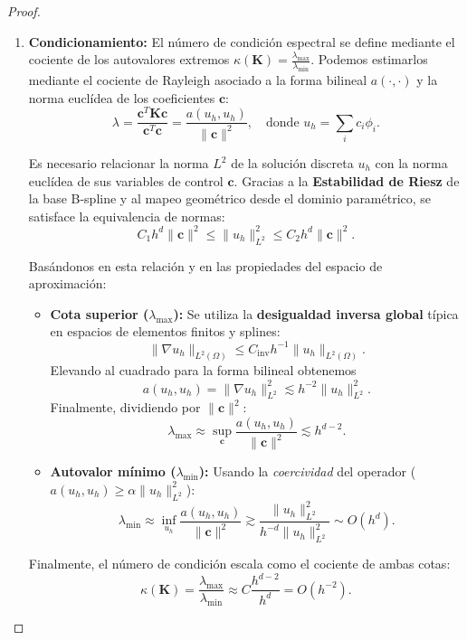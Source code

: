 \documentclass[11pt]{book}
\theoremstyle{plain} %
\theoremstyle{definition} %
\theoremstyle{definition} %
\begin{document}
\begin{proof}
\begin{enumerate}
        \item \textbf{Condicionamiento:} 
        El número de condición espectral se define mediante el cociente de los autovalores extremos $\kappa(\mathbf{K}) = \frac{\lambda_{\max}}{\lambda_{\min}}$. Podemos estimarlos mediante el cociente de Rayleigh asociado a la forma bilineal $a(\cdot, \cdot)$ y la norma euclídea de los coeficientes $\mathbf{c}$:
        $$ \lambda = \frac{\mathbf{c}^T \mathbf{K} \mathbf{c}}{\mathbf{c}^T \mathbf{c}} = \frac{a(u_h, u_h)}{\|\mathbf{c}\|^2}, \quad \text{donde } u_h = \sum_{i} c_i \phi_i. $$
        
        Es necesario relacionar la norma $L^2$ de la solución discreta $u_h$ con la norma euclídea de sus variables de control $\mathbf{c}$. Gracias a la \textbf{Estabilidad de Riesz} de la base B-spline y al mapeo geométrico desde el dominio paramétrico, se satisface la equivalencia de normas:
        $$ C_1 h^d \|\mathbf{c}\|^2 \le \|u_h\|_{L^2}^2 \le C_2 h^d \|\mathbf{c}\|^2. $$

        Basándonos en esta relación y en las propiedades del espacio de aproximación:        
        \begin{itemize}
            \item \textbf{Cota superior ($\lambda_{\max}$):} 
            Se utiliza la \textbf{desigualdad inversa global} típica en espacios de elementos finitos y splines:
            \begin{equation*}
                \|\nabla u_h\|_{L^2(\Omega)} \le C_{\text{inv}} h^{-1} \|u_h\|_{L^2(\Omega)}.
            \end{equation*}
            Elevando al cuadrado para la forma bilineal obtenemos
            $$ a(u_h, u_h) = \|\nabla u_h\|_{L^2}^2 \lesssim h^{-2} \|u_h\|_{L^2}^2. $$
            Finalmente, dividiendo por $\|\mathbf{c}\|^2$:
            $$ \lambda_{\max} \approx \sup_{\mathbf{c}} \frac{a(u_h, u_h)}{\|\mathbf{c}\|^2} \lesssim h^{d-2}. $$

            \item \textbf{Autovalor mínimo ($\lambda_{\min}$):} Usando la \textit{coercividad} del operador ($a(u_h, u_h) \ge \alpha \|u_h\|_{L^2}^2$):
            $$ \lambda_{\min} \approx \inf_{u_h} \frac{a(u_h, u_h)}{\|\mathbf{c}\|^2} \gtrsim \frac{\|u_h\|_{L^2}^2}{h^{-d} \|u_h\|_{L^2}^2} \sim O(h^d). $$
        \end{itemize}
        
        Finalmente, el número de condición escala como el cociente de ambas cotas:
        $$ \kappa(\mathbf{K}) = \frac{\lambda_{\max}}{\lambda_{\min}} \approx C \frac{h^{d-2}}{h^d} = O(h^{-2}). $$
    \end{enumerate}
\end{proof}
\end{document}
